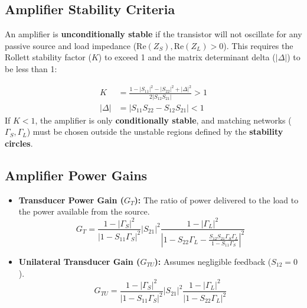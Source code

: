 \documentclass[12pt,a4paper]{article}
\begin{document}
\subsection{Amplifier Stability Criteria}
An amplifier is \textbf{unconditionally stable} if the transistor will not oscillate for any passive source and load impedance ($\text{Re}(Z_S), \text{Re}(Z_L) > 0$).
This requires the Rollett stability factor ($K$) to exceed 1 and the matrix determinant delta ($|\Delta|$) to be less than 1:

\begin{tcolorbox}[formulabox, title={\textbf{Rollett Stability Criteria}}]
\begin{align}
  K &= \frac{1 - |S_{11}|^2 - |S_{22}|^2 + |\Delta|^2}{2 |S_{12} S_{21}|} > 1 \\
  |\Delta| &= |S_{11}S_{22} - S_{12}S_{21}| < 1
\end{align}
If $K < 1$, the amplifier is only \textbf{conditionally stable}, and matching networks ($\Gamma_S, \Gamma_L$) must be chosen outside the unstable regions defined by the \textbf{stability circles}.
\end{tcolorbox}

\subsection{Amplifier Power Gains}
\begin{itemize}[leftmargin=*, itemsep=3pt]
  \item \textbf{Transducer Power Gain ($G_T$):} The ratio of power delivered to the load to the power available from the source.
    \begin{equation}
      G_T = \frac{1 - |\Gamma_S|^2}{|1 - S_{11}\Gamma_S|^2} |S_{21}|^2 \frac{1 - |\Gamma_L|^2}{|1 - S_{22}\Gamma_L - \frac{S_{12}S_{21}\Gamma_S\Gamma_L}{1 - S_{11}\Gamma_S}|^2}
    \end{equation}
  \item \textbf{Unilateral Transducer Gain ($G_{TU}$):} Assumes negligible feedback ($S_{12} = 0$).
    \begin{equation}
      G_{TU} = \frac{1 - |\Gamma_S|^2}{|1 - S_{11}\Gamma_S|^2} |S_{21}|^2 \frac{1 - |\Gamma_L|^2}{|1 - S_{22}\Gamma_L|^2}
    \end{equation}
\end{itemize}
\end{document}
